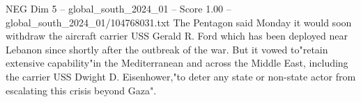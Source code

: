 \begin{textsample}{NEG Dim 5 – global\_south\_2024\_01 – Score 1.00 – global\_south\_2024\_01/104768031.txt}
The Pentagon said Monday it would soon withdraw the aircraft carrier USS Gerald R.
Ford which has been deployed near Lebanon since shortly after the outbreak of the war.
But it vowed to"retain extensive capability"in the Mediterranean and across the Middle East, including the carrier USS Dwight D.
Eisenhower,"to deter any state or non-state actor from escalating this crisis beyond Gaza".

\end{textsample}
